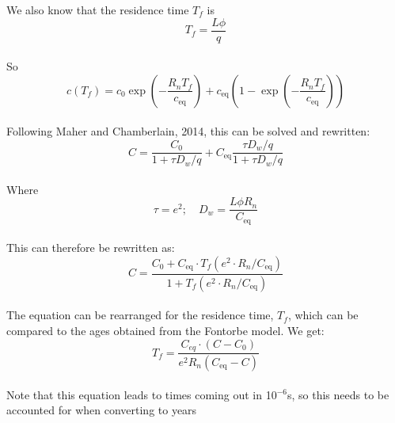 We also know that the residence time \( T_f \) is \\

\begin{equation}
T_f = \frac{L\phi}{q}
\end{equation} \\

So \\

\begin{equation}
c(T_f) = c_0 \exp\left(-\frac{R_n T_f}{c_{\text{eq}}} \right) + c_{\text{eq}} \left( 1 - \exp\left(-\frac{R_n T_f}{c_{\text{eq}}} \right) \right)
\end{equation} \\

Following Maher and Chamberlain, 2014, this can be solved and rewritten: \\


\begin{equation}
    C =  \frac{C_{\text{0}}}{1 + \tau D_w / q} + C_{\text{eq}} \frac{\tau D_w / q}{1 + \tau D_w / q}
\end{equation} \\
    
Where \\

\begin{equation}
\tau = e^2; \quad D_w = \frac{L\phi R_n}{C_{\text{eq}}}
\end{equation} \\

This can therefore be rewritten as: \\

\begin{equation}
    C = \frac{C_{\text{0}} + C_{\text{eq}} \cdot T_f\left(e^2 \cdot R_n / C_{\text{eq}}\right)}{1 + T_f\left(e^2 \cdot R_n / C_{\text{eq}}\right)}
\end{equation} \\

The equation can be rearranged for the residence time, \( T_f \), which can be compared to the ages obtained from the Fontorbe model. We get:\\

\begin{equation}
    T_f = \frac{C_{eq} \cdot \left(C - C_0\right)}{e^2 R_n \left( C_{\text{eq}} - C \right)}
\end{equation}\\

Note that this equation leads to times coming out in 10$^{-6}$s, so this needs to be accounted for when converting to years\\

